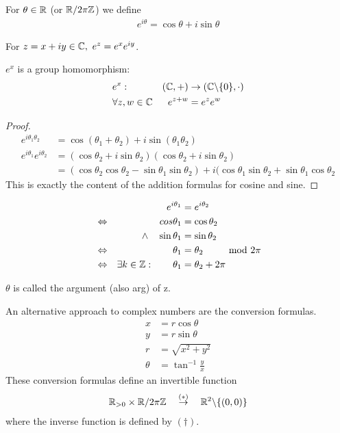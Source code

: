 \begin{df}
	For $\theta \in \mathbb R$ (or $\mathbb R/2\pi \mathbb Z$) we define
	\begin{align*}
	e^{i\theta} = \cos \theta + i \sin \theta
	\end{align*}
\end{df}

\begin{rk}
	For $z = x+iy \in \mathbb C, ~e^z = e^x e^{iy}$.
\end{rk}

\begin{pp}
$e^x$ is a group homomorphism:
\begin{align*}
& e^x: & (\mathbb C, +) & \to (\mathbb C \backslash \{0\}, \cdot) \\
& \forall z,w \in \mathbb C & e^{z+w} & = e^ze^w
\end{align*}
\end{pp}

\begin{proof}
\begin{align*}
e^{i\theta_1 \theta_2} & = \cos(\theta_1+\theta_2) + i \sin (\theta_1 \theta_2) \\
e^{i\theta_1} e^{i\theta_2} & = (\cos \theta_2 + i \sin \theta_2)(\cos \theta_2 + i \sin \theta_2) \\
& = (\cos \theta_2 \cos \theta_2 - \sin \theta_1 \sin \theta_2) + i (\cos \theta_1 \sin \theta_2 + \sin \theta_1 \cos \theta_2
\end{align*}
This is exactly the content of the addition formulas for cosine and sine.
\end{proof}

\begin{rk}
	\begin{align*}
	& & e^{i\theta_1} & = e^{i\theta_2} \\
	& \Leftrightarrow & cos \theta_1 & = \cos \theta_2 \\
	& & \wedge \quad \sin \theta_1 & = \sin \theta_2 \\
	& \Leftrightarrow & \theta_1 & = \theta_2 \qquad \mod 2 \pi \\
	& \Leftrightarrow & \exists k \in \mathbb Z: \qquad \theta_1 & = \theta_2 + 2 \pi
	\end{align*}
\end{rk}

\begin{df}
$\theta$ is called the argument (also arg) of z.
\end{df}


An alternative approach to complex numbers are the conversion formulas.
\begin{align*}
x & = r \cos \theta \\
y & = r \sin \theta \tag{$*$}\\
r & = \sqrt{x^2+y^2} \\
\theta & = \tan^{-1} \frac y x \tag{$\dagger$}
\end{align*}
These conversion formulas define an invertible function
\begin{align*}
\mathbb R_{>0} \times \mathbb R/2\pi\mathbb Z \quad \overset{(*)}{\to} \quad \mathbb R^2\backslash\{(0,0)\} 
\end{align*}
where the inverse function is defined by $(\dagger)$.


